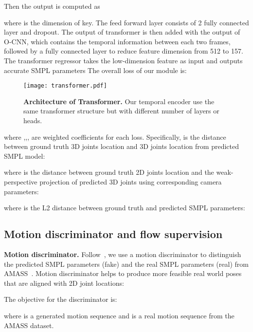 \documentclass[10pt,twocolumn,letterpaper]{article}
\begin{document}
Then the output is computed as 

where  is the dimension of key. The feed forward layer consists of 2 fully connected layer and dropout.
The output of transformer is then added with the output of O-CNN, which contains the temporal information between each two frames, followed by a fully connected layer to reduce feature dimension from 512 to 157. The transformer regressor takes the low-dimension feature as input and outputs accurate SMPL parameters 
The overall loss of our module is:


\begin{figure}[t]
\centering
\texttt{[image: transformer.pdf]}


\caption{\textbf{Architecture of Transformer.} Our temporal encoder use the same transformer structure but with different number of layers or heads.}
\label{transformer}
\end{figure}
where ,,, are weighted coefficients for each loss.
Specifically,  is the  distance between ground truth 3D joints location  and 3D joints location  from predicted SMPL model:

where  is the  distance between ground truth 2D joints location and the weak-perspective projection of predicted 3D joints using corresponding camera parameters:

where  is the L2 distance between ground truth and predicted SMPL parameters:




\subsection{Motion discriminator and flow supervision}
{\bf Motion discriminator.} Follow~\cite{kocabas2020vibe}, we use a motion discriminator  to distinguish the predicted SMPL parameters (fake) and the real SMPL parameters (real) from AMASS~\cite{mahmood2019amass}. Motion discriminator helps to produce more feasible real world poses that are aligned with 2D joint locations:



The objective for the discriminator is:

where  is a generated motion sequence and  is a real motion sequence from the AMASS dataset. 
\end{document}
